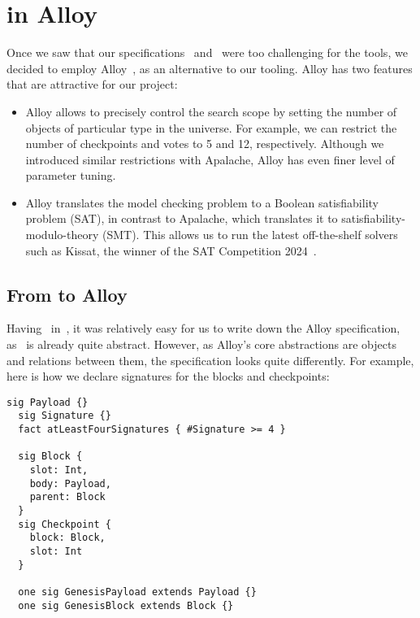 
\section{\SpecThreeB{} in Alloy}\label{sec:alloy}

Once we saw that our specifications~\SpecThree{} and~\SpecFour{}
were too challenging for the \tlap{} tools, we decided to employ
Alloy~\cite{jackson2012software,alloytools}, as an alternative to our tooling.
Alloy has two features that are attractive for our project:

\begin{itemize}

  \item Alloy allows to precisely control the search scope by setting the
      number of objects of particular type in the universe. For example, we can
      restrict the number of checkpoints and votes to 5 and 12, respectively.
      Although we introduced similar restrictions with Apalache, Alloy has even
      finer level of parameter tuning.

  \item Alloy translates the model checking problem to a Boolean satisfiability
      problem (SAT), in contrast to Apalache, which translates it to satisfiability-modulo-theory (SMT).  This
      allows us to run the latest off-the-shelf solvers such as Kissat, the
      winner of the SAT Competition 2024~\cite{SAT-Competition-2024-solvers}.

\end{itemize}

\subsection{From \tlap{} to Alloy}

Having~\SpecThree{} in~\tlap{}, it was relatively easy for us to write down
the Alloy specification, as~\SpecThree{} is already quite abstract. However, as
Alloy's core abstractions are objects and relations between them, the
specification looks quite differently. For example, here is how we declare
signatures for the blocks and checkpoints:

\begin{lstlisting}[language=alloy,columns=fullflexible]
  sig Payload {}
  sig Signature {}
  fact atLeastFourSignatures { #Signature >= 4 }

  sig Block {
    slot: Int,
    body: Payload,
    parent: Block
  }
  sig Checkpoint {
    block: Block,
    slot: Int
  }

  one sig GenesisPayload extends Payload {}
  one sig GenesisBlock extends Block {}
\end{lstlisting}


